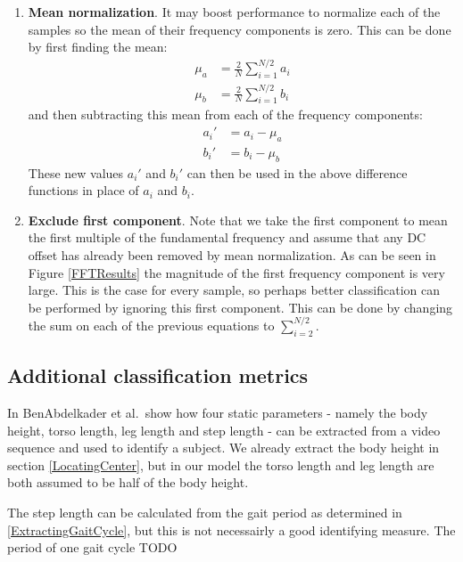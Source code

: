 \begin{enumerate}
	\item \textbf{Mean normalization}.
		It may boost performance to normalize each of the samples so the mean of their frequency components is zero.
		This can be done by first finding the mean:
		\begin{align}
			\mu_a &= \frac{2}{N} \sum_{i=1}^{N/2} a_i \\
			\mu_b &= \frac{2}{N} \sum_{i=1}^{N/2} b_i
		\end{align}
		and then subtracting this mean from each of the frequency components:
		\begin{align}
			a_i' &= a_i - \mu_a \\
			b_i' &= b_i - \mu_b
		\end{align}
		These new values $a_i'$ and $b_i'$ can then be used in the above difference functions in place of $a_i$ and $b_i$.
	
	\item \textbf{Exclude first component}.
		Note that we take the first component to mean the first multiple of the fundamental frequency and assume that any DC offset has already been removed
		by mean normalization.
		As can be seen in Figure \ref{FFTResults} the magnitude of the first frequency component is very large.
		This is the case for every sample, so perhaps better classification can be performed by ignoring this first component.
		This can be done by changing the sum on each of the previous equations to $\sum_{i=2}^{N/2}$.
\end{enumerate}


\subsection{Additional classification metrics}

In \cite{StrideCadence} BenAbdelkader et al.\ show how four static parameters - namely the body height, torso length, leg length and step length - can be extracted from a video sequence and used to identify a subject.
We already extract the body height in section \ref{LocatingCenter}, but in our model the torso length and leg length are both assumed to be half of the body height.

The step length can be calculated from the gait period as determined in \ref{ExtractingGaitCycle}, but this is not necessairly a good identifying measure.
The period of one gait cycle TODO 

